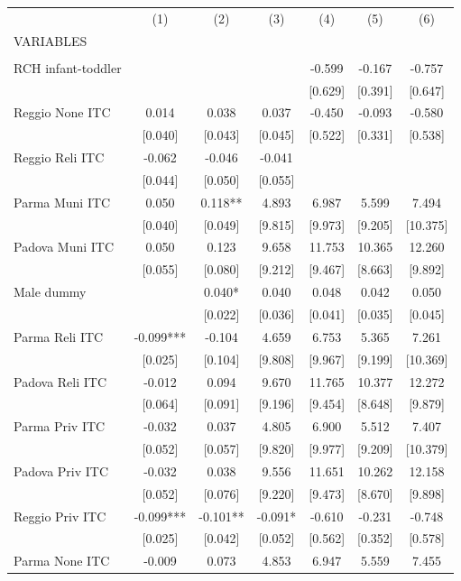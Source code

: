 \begin{tabular}{lcccccc} \hline
 & (1) & (2) & (3) & (4) & (5) & (6) \\
VARIABLES &  &  &  &  &  &  \\ \hline
 &  &  &  &  &  &  \\
RCH infant-toddler &  &  &  & -0.599 & -0.167 & -0.757 \\
 &  &  &  & [0.629] & [0.391] & [0.647] \\
Reggio None ITC & 0.014 & 0.038 & 0.037 & -0.450 & -0.093 & -0.580 \\
 & [0.040] & [0.043] & [0.045] & [0.522] & [0.331] & [0.538] \\
Reggio Reli ITC & -0.062 & -0.046 & -0.041 &  &  &  \\
 & [0.044] & [0.050] & [0.055] &  &  &  \\
Parma Muni ITC & 0.050 & 0.118** & 4.893 & 6.987 & 5.599 & 7.494 \\
 & [0.040] & [0.049] & [9.815] & [9.973] & [9.205] & [10.375] \\
Padova Muni ITC & 0.050 & 0.123 & 9.658 & 11.753 & 10.365 & 12.260 \\
 & [0.055] & [0.080] & [9.212] & [9.467] & [8.663] & [9.892] \\
Male dummy &  & 0.040* & 0.040 & 0.048 & 0.042 & 0.050 \\
 &  & [0.022] & [0.036] & [0.041] & [0.035] & [0.045] \\
Parma Reli ITC & -0.099*** & -0.104 & 4.659 & 6.753 & 5.365 & 7.261 \\
 & [0.025] & [0.104] & [9.808] & [9.967] & [9.199] & [10.369] \\
Padova Reli ITC & -0.012 & 0.094 & 9.670 & 11.765 & 10.377 & 12.272 \\
 & [0.064] & [0.091] & [9.196] & [9.454] & [8.648] & [9.879] \\
Parma Priv ITC & -0.032 & 0.037 & 4.805 & 6.900 & 5.512 & 7.407 \\
 & [0.052] & [0.057] & [9.820] & [9.977] & [9.209] & [10.379] \\
Padova Priv ITC & -0.032 & 0.038 & 9.556 & 11.651 & 10.262 & 12.158 \\
 & [0.052] & [0.076] & [9.220] & [9.473] & [8.670] & [9.898] \\
Reggio Priv ITC & -0.099*** & -0.101** & -0.091* & -0.610 & -0.231 & -0.748 \\
 & [0.025] & [0.042] & [0.052] & [0.562] & [0.352] & [0.578] \\
Parma None ITC & -0.009 & 0.073 & 4.853 & 6.947 & 5.559 & 7.455 \\

\end{tabular}
